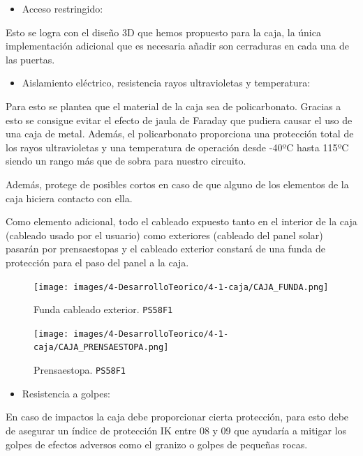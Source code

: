 \begin{itemize}
    \item Acceso restringido:
\end{itemize}

Esto se logra con el diseño 3D que hemos propuesto para la caja, la única implementación adicional que es necesaria añadir son cerraduras en cada una de las puertas.

\begin{itemize}
    \item Aislamiento eléctrico, resistencia rayos ultravioletas y temperatura:
\end{itemize}

Para esto se plantea que el material de la caja sea de policarbonato. Gracias a esto se consigue evitar el efecto de jaula de Faraday que pudiera causar el uso de una caja de metal. Además, el policarbonato proporciona una protección total de los rayos ultravioletas y una temperatura de operación desde -40ºC hasta 115ºC siendo un rango más que de sobra para nuestro circuito.

Además, protege de posibles cortos en caso de que alguno de los elementos de la caja hiciera contacto con ella.

Como elemento adicional, todo el cableado expuesto tanto en el interior de la caja (cableado usado por el usuario) como exteriores (cableado del panel solar) pasarán por prensaestopas y el cableado exterior constará de una funda de protección para el paso del panel a la caja.
\begin{figure}[H]
    \centering
    \texttt{[image: images/4-DesarrolloTeorico/4-1-caja/CAJA\_FUNDA.png]}
    \caption{Funda cableado exterior. \texttt{PS58F1}}
    \label{fig:DesarrolloTeorico/Caja/CAJA_FUNDA}
\end{figure}

\begin{figure}[H]
    \centering
    \texttt{[image: images/4-DesarrolloTeorico/4-1-caja/CAJA\_PRENSAESTOPA.png]}
    \caption{Prensaestopa. \texttt{PS58F1}}
    \label{fig:DesarrolloTeorico/Caja/CAJA_PRENSAESTOPA}
\end{figure}


\begin{itemize}
    \item Resistencia a golpes:
\end{itemize}

En caso de impactos la caja debe proporcionar cierta protección, para esto debe de asegurar un índice de protección IK entre 08 y 09 que ayudaría a mitigar los golpes de efectos adversos como el granizo o golpes de pequeñas rocas.

